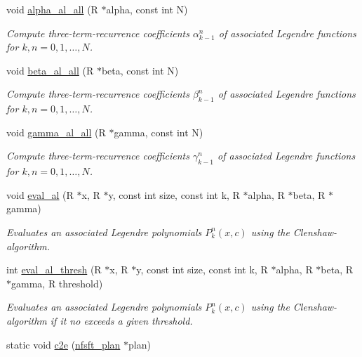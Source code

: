 \begin{DoxyCompactItemize}
\item 
void \hyperlink{group__nfsft_ga6b01d5f2e8b3a026906e977118d7b0d2}{alpha\-\_\-al\-\_\-all} (R $\ast$alpha, const int N)
\begin{DoxyCompactList}\small\item\em Compute three-\/term-\/recurrence coefficients $\alpha_{k-1}^n$ of associated Legendre functions for $k,n = 0,1,\ldots,N$. \end{DoxyCompactList}\item 
void \hyperlink{group__nfsft_gaf0fb6a3993b3c956bea8fa75e3a71290}{beta\-\_\-al\-\_\-all} (R $\ast$beta, const int N)
\begin{DoxyCompactList}\small\item\em Compute three-\/term-\/recurrence coefficients $\beta_{k-1}^n$ of associated Legendre functions for $k,n = 0,1,\ldots,N$. \end{DoxyCompactList}\item 
void \hyperlink{group__nfsft_ga88de851c8f9a4c042ad101cb4fb8c51d}{gamma\-\_\-al\-\_\-all} (R $\ast$gamma, const int N)
\begin{DoxyCompactList}\small\item\em Compute three-\/term-\/recurrence coefficients $\gamma_{k-1}^n$ of associated Legendre functions for $k,n = 0,1,\ldots,N$. \end{DoxyCompactList}\item 
void \hyperlink{group__nfsft_gac5f2f8c36dc4f8ca65f058af6491f163}{eval\-\_\-al} (R $\ast$x, R $\ast$y, const int size, const int k, R $\ast$alpha, R $\ast$beta, R $\ast$gamma)
\begin{DoxyCompactList}\small\item\em Evaluates an associated Legendre polynomials $P_k^n(x,c)$ using the Clenshaw-\/algorithm. \end{DoxyCompactList}\item 
int \hyperlink{group__nfsft_ga1bc5682379de94e87031afa38e02675d}{eval\-\_\-al\-\_\-thresh} (R $\ast$x, R $\ast$y, const int size, const int k, R $\ast$alpha, R $\ast$beta, R $\ast$gamma, R threshold)
\begin{DoxyCompactList}\small\item\em Evaluates an associated Legendre polynomials $P_k^n(x,c)$ using the Clenshaw-\/algorithm if it no exceeds a given threshold. \end{DoxyCompactList}\item 
static void \hyperlink{group__nfsft_ga47209b28b6561fca7349ed8afa5f9656}{c2e} (\hyperlink{structnfsft__plan}{nfsft\-\_\-plan} $\ast$plan)

\end{DoxyCompactItemize}
